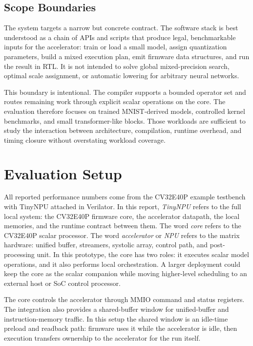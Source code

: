 \documentclass[a4paper, 12pt, titlepage]{article}
\begin{document}
\subsection{Scope Boundaries}
The system targets a narrow but concrete contract. The software stack is best understood as a chain of APIs and scripts that produce legal, benchmarkable inputs for the accelerator: train or load a small model, assign quantization parameters, build a mixed execution plan, emit firmware data structures, and run the result in RTL. It is not intended to solve global mixed-precision search, optimal scale assignment, or automatic lowering for arbitrary neural networks.

This boundary is intentional. The compiler supports a bounded operator set and routes remaining work through explicit scalar operations on the core. The evaluation therefore focuses on trained MNIST-derived models, controlled kernel benchmarks, and small transformer-like blocks. Those workloads are sufficient to study the interaction between architecture, compilation, runtime overhead, and timing closure without overstating workload coverage.

\newpage
\section{Evaluation Setup}
All reported performance numbers come from the CV32E40P example testbench with TinyNPU attached in Verilator. In this report, \emph{TinyNPU} refers to the full local system: the CV32E40P firmware core, the accelerator datapath, the local memories, and the runtime contract between them. The word \emph{core} refers to the CV32E40P scalar processor. The word \emph{accelerator} or \emph{NPU} refers to the matrix hardware: unified buffer, streamers, systolic array, control path, and post-processing unit. In this prototype, the core has two roles: it executes scalar model operations, and it also performs local orchestration. A larger deployment could keep the core as the scalar companion while moving higher-level scheduling to an external host or SoC control processor.

The core controls the accelerator through MMIO command and status registers. The integration also provides a shared-buffer window for unified-buffer and instruction-memory traffic. In this setup the shared window is an idle-time preload and readback path: firmware uses it while the accelerator is idle, then execution transfers ownership to the accelerator for the run itself.
\end{document}
